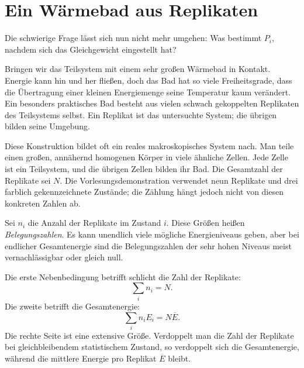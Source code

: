 \section{Ein Wärmebad aus Replikaten}

Die schwierige Frage lässt sich nun nicht mehr umgehen: Was bestimmt \(P_i\), nachdem sich das Gleichgewicht eingestellt hat?

Bringen wir das Teilsystem mit einem sehr großen Wärmebad in Kontakt. Energie kann hin und her fließen, doch das Bad hat so viele Freiheitsgrade, dass die Übertragung einer kleinen Energiemenge seine Temperatur kaum verändert. Ein besonders praktisches Bad besteht aus vielen schwach gekoppelten Replikaten des Teilsystems selbst. Ein Replikat ist das untersuchte System; die übrigen bilden seine Umgebung.

Diese Konstruktion bildet oft ein reales makroskopisches System nach. Man teile einen großen, annähernd homogenen Körper in viele ähnliche Zellen. Jede Zelle ist ein Teilsystem, und die übrigen Zellen bilden ihr Bad. Die Gesamtzahl der Replikate sei \(N\). Die Vorlesungsdemonstration verwendet neun Replikate und drei farblich gekennzeichnete Zustände; die Zählung hängt jedoch nicht von diesen konkreten Zahlen ab.

Sei \(n_i\) die Anzahl der Replikate im Zustand \(i\). Diese Größen heißen \emph{Belegungszahlen}. Es kann unendlich viele mögliche Energieniveaus geben, aber bei endlicher Gesamtenergie sind die Belegungszahlen der sehr hohen Niveaus meist vernachlässigbar oder gleich null.

Die erste Nebenbedingung betrifft schlicht die Zahl der Replikate:
\begin{equation}
 \sum_i n_i=N.
 \label{eq:sm3-number-constraint}
\end{equation}
Die zweite betrifft die Gesamtenergie:
\begin{equation}
 \sum_i n_iE_i=N\overline E.
 \label{eq:sm3-total-energy-constraint}
\end{equation}
Die rechte Seite ist eine extensive Größe. Verdoppelt man die Zahl der Replikate bei gleichbleibendem statistischem Zustand, so verdoppelt sich die Gesamtenergie, während die mittlere Energie pro Replikat \(\overline E\) bleibt.

\begin{classroomqa}
\end{classroomqa}

